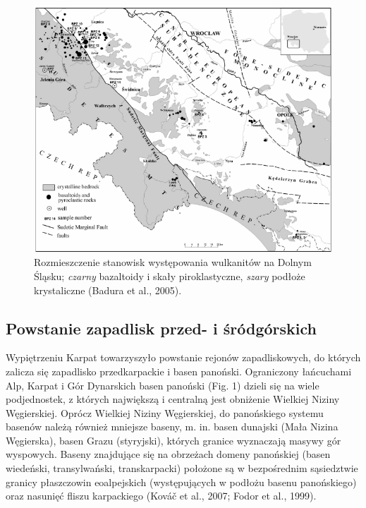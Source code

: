 \documentclass[11.5pt,twoside]{report}
\begin{document}
\begin{figure}[h]
	\centering
	\includegraphics[width=0.7\linewidth]{../Termika/dslwulkanity}
	\caption{Rozmieszczenie stanowisk występowania wulkanitów na Dolnym Śląsku; \textit{czarny} bazaltoidy i skały piroklastyczne, \textit{szary} podłoże krystaliczne (Badura et al., 2005).}
	\label{Fig.}
\end{figure}



  

	
	\subsection{Powstanie zapadlisk przed- i śródgórskich}
	
Wypiętrzeniu Karpat towarzyszyło powstanie rejonów zapadliskowych, do których zalicza się zapadlisko przedkarpackie i basen panoński. Ograniczony łańcuchami Alp, Karpat i Gór Dynarskich basen panoński (Fig. 1) dzieli się na wiele podjednostek, z których największą i centralną jest obniżenie Wielkiej Niziny Węgierskiej. Oprócz Wielkiej Niziny Węgierskiej, do panońskiego systemu basenów należą również mniejsze baseny, m. in. basen dunajski (Mała Nizina Węgierska), basen Grazu (styryjski), których granice wyznaczają masywy gór wyspowych. Baseny znajdujące się na obrzeżach domeny panońskiej (basen wiedeński, transylwański, transkarpacki) położone są w bezpośrednim sąsiedztwie granicy płaszczowin eoalpejskich (występujących w podłożu basenu panońskiego) oraz nasunięć fliszu karpackiego (Kováč et al., 2007; Fodor et al., 1999).
\end{document}
